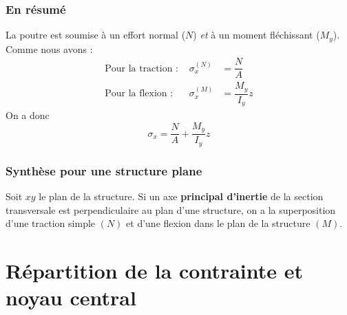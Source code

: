 		\subsubsection{En résumé}
		La poutre est soumise à un effort normal ($N$) \textit{et} à un moment 
		fléchissant ($M_y$). Comme nous avons :
		\begin{equation}
		\begin{array}{lll}
		\text{Pour la traction : } & \sigma_x^{(N)} &= \dfrac{N}{A}\\
		\text{Pour la flexion : } & \sigma_x^{(M)} &= \dfrac{M_y}{I_y}z		
		\end{array}
		\end{equation}
		On a donc
		\begin{equation}
		\sigma_x = \dfrac{N}{A}+\dfrac{M_y}{I_y}z
		\end{equation}
		
		\subsubsection{Synthèse pour une structure plane}
		Soit $xy$ le plan de la structure. Si un axe \textbf{principal d'inertie} 
		de la section transversale est perpendiculaire au plan d'une structure, 
		on a la superposition d'une traction simple $(N)$ et d'une flexion dans le 
		plan de la structure $(M)$.
		
		
\section{Répartition de la contrainte et noyau central}

